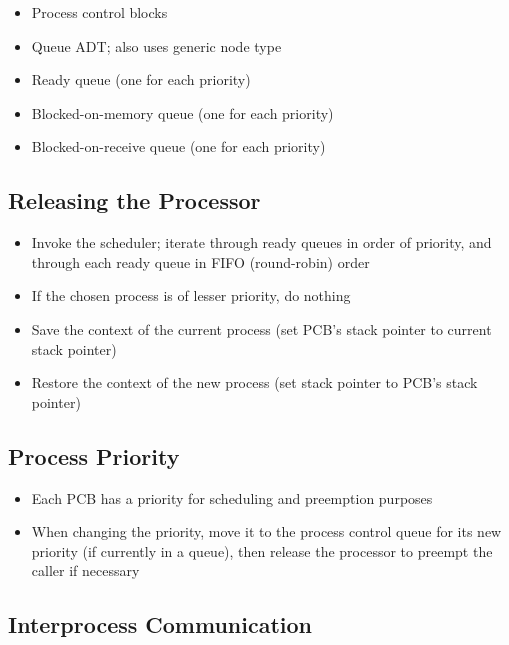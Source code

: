 \documentclass[12pt]{report}
\begin{document}
\begin{itemize}
    \item Process control blocks
    \item Queue ADT; also uses generic node type
    \item Ready queue (one for each priority)
    \item Blocked-on-memory queue (one for each priority)
    \item Blocked-on-receive queue (one for each priority)
\end{itemize}

\subsection{Releasing the Processor}

\begin{itemize}
    \item Invoke the scheduler; iterate through ready queues in order of priority, and through each ready queue in FIFO (round-robin) order
    \item If the chosen process is of lesser priority, do nothing
    \item Save the context of the current process (set PCB's stack pointer to current stack pointer)
    \item Restore the context of the new process (set stack pointer to PCB's stack pointer)
\end{itemize}

\subsection{Process Priority}

\begin{itemize}
    \item Each PCB has a priority for scheduling and preemption purposes
    \item When changing the priority, move it to the process control queue for its new priority (if currently in a queue), then release the processor to preempt the caller if necessary
\end{itemize}

\subsection{Interprocess Communication}
\end{document}
